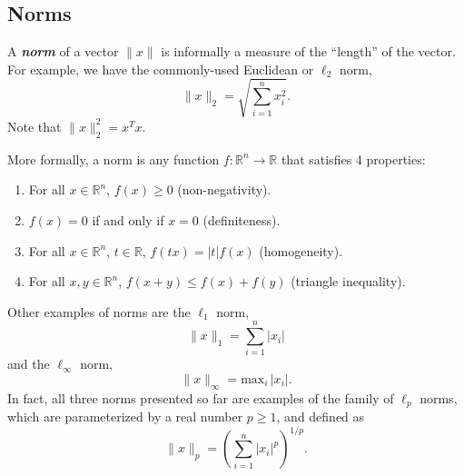 \documentclass[12pt]{article}
\newcommand{\commentout}[1]{}
\begin{document}
\commentout{
As an example of how these properties can be proven, we'll consider the last
property given above.  Suppose that $A \in \mathbb{R}^{m \times n}$, 
$B \in \mathbb{R}^{n \times p}$, and $C \in \mathbb{R}^{p \times m}$ (so that $ABC \in \mathbb{R}^{m \times m}$ is a square matrix).
In this case, it is easy to see that $BCA \in \mathbb{R}^{n \times n}$ is also
a square matrix.  To verify that $\mathrm{tr}ABC = \mathrm{tr}BCA$, observe that
\begin{eqnarray*}
  \mathrm{tr} ABC &=& \sum_{i=1}^m (ABC)_{ii} = \sum_{i=1}^m \left(\sum_{j=1}^p (AB)_{ij} C_{ji} \right) = \sum_{i=1}^m \left(\sum_{j=1}^p \left( \sum_{k=1}^n A_{ik} B_{kj} \right) C_{ji} \right) \\
  &=& \sum_{i=1}^m \sum_{j=1}^p \sum_{k=1}^n A_{ik} B_{kj} C_{ji} = \sum_{k=1}^n \sum_{i=1}^m \sum_{j=1}^p B_{kj} C_{ji} A_{ik} \\
  &=& \sum_{k=1}^n \sum_{i=1}^m \left( \sum_{j=1}^p B_{kj} C_{ji} \right) A_{ik} = \sum_{k=1}^n \sum_{i=1}^m (BC)_{ki} A_{ik} \\
  &=& \sum_{k=1}^n (BCA)_{kk} = \mathrm{tr} BCA.
\end{eqnarray*}
}

\subsection{Norms}

A \textbf{\textit{norm}} of a vector $\|x\|$ is informally a measure of
the ``length'' of the vector.  For example, we have the 
commonly-used Euclidean or $\ell_2$ norm,
\[\|x\|_2 = \sqrt{\sum_{i=1}^n x_i^2}.\]
Note that $\|x\|_2^2 = x^Tx$.

More formally, a norm is any function $f : \mathbb{R}^{n} \rightarrow
\mathbb{R}$ that satisfies 4 properties:
\begin{enumerate}
\item For all $x \in \mathbb{R}^n$, $f(x) \geq 0$ (non-negativity).
\item $f(x) = 0$ if and only if $x = 0$ (definiteness).
\item For all $x \in \mathbb{R}^n$, $t \in \mathbb{R}$, $f(tx) =
  |t|f(x)$ (homogeneity).
\item For all $x,y \in \mathbb{R}^n$, $f(x + y) \leq f(x) + f(y)$
  (triangle inequality).
\end{enumerate}
Other examples of norms are the $\ell_1$ norm,
\[\|x\|_1 = \sum_{i=1}^n |x_i| \]
and the $\ell_\infty$ norm,
\[\|x\|_\infty = \mathrm{max}_i\, |x_i|.\]
In fact, all three norms presented so far are examples of the family
of $\ell_p$ norms, which are parameterized by a real number $p \geq
1$, and defined as
\[\|x\|_p = \left ( \sum_{i=1}^n |x_i|^p \right )^{1/p}.\]
\end{document}
